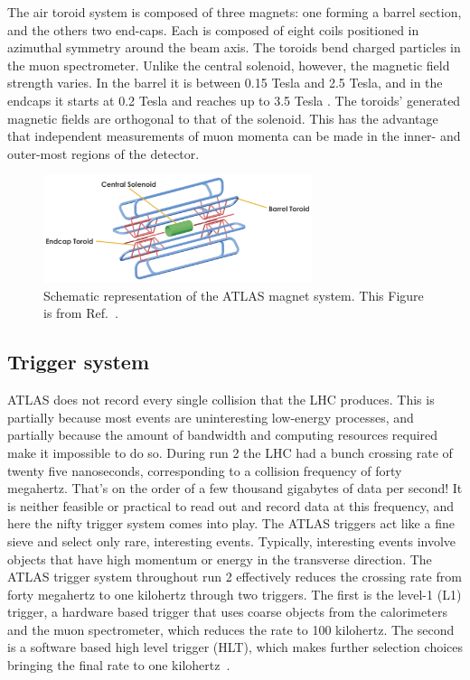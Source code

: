 The air toroid system is composed of three magnets: one forming a barrel section, and the others two end-caps. Each is composed of eight coils positioned in azimuthal symmetry around the beam axis. The toroids bend charged particles in the muon spectrometer. Unlike the central solenoid, however, the magnetic field strength varies. In the barrel it is between 0.15 Tesla and 2.5 Tesla, and in the endcaps it starts at 0.2 Tesla and reaches up to 3.5 Tesla . The toroids' generated magnetic fields are orthogonal to that of the solenoid. This has the advantage that independent measurements of muon momenta can be made in the inner- and outer-most regions of the detector.

\begin{figure}[htb!]
    \centering
    \includegraphics[width=0.7\textwidth]{Figures/LHC/exp-magnets.png}
    \caption{Schematic representation of the ATLAS magnet system. This Figure is from Ref.~\cite{atlasmagnet}.}
    \label{fig:atlasmagnets}
\end{figure}

\subsection{Trigger system}
\label{ssec:ATLAStrigger}
ATLAS does not record every single collision that the LHC produces. This is partially because most events are uninteresting low-energy processes, and partially because the amount of bandwidth and computing resources required make it impossible to do so. During run 2 the LHC had a bunch crossing rate of twenty five nanoseconds, corresponding to a collision frequency of forty megahertz. That's on the order of a few thousand gigabytes of data per second! It is neither feasible or practical to read out and record data at this frequency, and here the nifty trigger system comes into play. The ATLAS triggers act like a fine sieve and select only rare, interesting events. Typically, interesting events involve objects that have high momentum or energy in the transverse direction. The ATLAS trigger system throughout run 2 effectively reduces the crossing rate from forty megahertz to one kilohertz through two triggers. The first is the level-1 (L1) trigger, a hardware based trigger that uses coarse objects from the calorimeters and the muon spectrometer, which reduces the rate to 100 kilohertz. The second is a software based high level trigger (HLT), which makes further selection choices bringing the final rate to one kilohertz~\cite{zurNedden:2238679}. 

